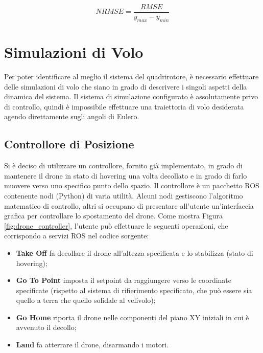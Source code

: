 \begin{equation}
	NRMSE = \frac{RMSE}{y_{max} - y_{min}}
	\label{nrmse}
\end{equation}


\section{Simulazioni di Volo}
Per poter identificare al meglio il sistema del quadrirotore, è necessario effettuare delle simulazioni di volo che siano in grado di descrivere i singoli aspetti della dinamica del sistema. Il sistema di simulazione configurato è assolutamente privo di controllo, quindi è impossibile effettuare una traiettoria di volo desiderata agendo direttamente sugli angoli di Eulero.\\

\subsection{Controllore di Posizione}
Si è deciso di utilizzare un controllore, fornito già implementato, in grado di mantenere il drone in stato di hovering una volta decollato e in grado di farlo muovere verso uno specifico punto dello spazio. Il controllore è un pacchetto \acs{ROS} contenente nodi (Python) di varia utilità. Alcuni nodi gestiscono l'algoritmo matematico di controllo, altri si occupano di presentare all'utente un'interfaccia grafica per controllare lo spostamento del drone. Come mostra Figura \ref{fig:drone_controller}, l'utente può effettuare le seguenti operazioni, che corrispondo a servizi \acs{ROS} nel codice sorgente:
\begin{itemize}
	\item \textbf{Take Off} fa decollare il drone all'altezza specificata e lo stabilizza (stato di hovering);
	\item \textbf{Go To Point} imposta il setpoint da raggiungere verso le coordinate specificate (rispetto al sistema di rifierimento specificato, che può essere sia quello a terra che quello solidale al velivolo);
	\item \textbf{Go Home} riporta il drone nelle componenti del piano XY iniziali in cui è avvenuto il decollo;
	\item \textbf{Land} fa atterrare il drone, disarmando i motori.
\end{itemize}

